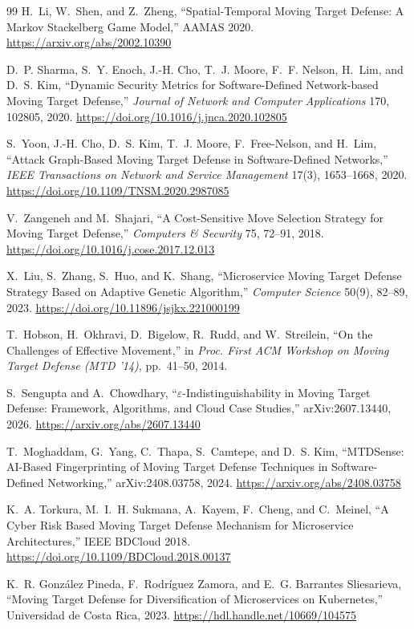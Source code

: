 \documentclass[11pt,letterpaper]{article}
\begin{document}
\begin{thebibliography}{99}
 H.~Li, W.~Shen, and Z.~Zheng, ``Spatial-Temporal Moving Target Defense: A Markov Stackelberg Game Model,'' AAMAS 2020. \url{https://arxiv.org/abs/2002.10390}

 D.~P. Sharma, S.~Y. Enoch, J.-H. Cho, T.~J. Moore, F.~F. Nelson, H.~Lim, and D.~S. Kim, ``Dynamic Security Metrics for Software-Defined Network-based Moving Target Defense,'' \emph{Journal of Network and Computer Applications} 170, 102805, 2020. \url{https://doi.org/10.1016/j.jnca.2020.102805}

 S.~Yoon, J.-H. Cho, D.~S. Kim, T.~J. Moore, F.~Free-Nelson, and H.~Lim, ``Attack Graph-Based Moving Target Defense in Software-Defined Networks,'' \emph{IEEE Transactions on Network and Service Management} 17(3), 1653--1668, 2020. \url{https://doi.org/10.1109/TNSM.2020.2987085}

 V.~Zangeneh and M.~Shajari, ``A Cost-Sensitive Move Selection Strategy for Moving Target Defense,'' \emph{Computers \& Security} 75, 72--91, 2018. \url{https://doi.org/10.1016/j.cose.2017.12.013}

 X.~Liu, S.~Zhang, S.~Huo, and K.~Shang, ``Microservice Moving Target Defense Strategy Based on Adaptive Genetic Algorithm,'' \emph{Computer Science} 50(9), 82--89, 2023. \url{https://doi.org/10.11896/jsjkx.221000199}

 T.~Hobson, H.~Okhravi, D.~Bigelow, R.~Rudd, and W.~Streilein, ``On the Challenges of Effective Movement,'' in \emph{Proc. First ACM Workshop on Moving Target Defense (MTD '14)}, pp.~41--50, 2014.

 S.~Sengupta and A.~Chowdhary, ``$\varepsilon$-Indistinguishability in Moving Target Defense: Framework, Algorithms, and Cloud Case Studies,'' arXiv:2607.13440, 2026. \url{https://arxiv.org/abs/2607.13440}

 T.~Moghaddam, G.~Yang, C.~Thapa, S.~Camtepe, and D.~S. Kim, ``MTDSense: AI-Based Fingerprinting of Moving Target Defense Techniques in Software-Defined Networking,'' arXiv:2408.03758, 2024. \url{https://arxiv.org/abs/2408.03758}

 K.~A. Torkura, M.~I.~H. Sukmana, A.~Kayem, F.~Cheng, and C.~Meinel, ``A Cyber Risk Based Moving Target Defense Mechanism for Microservice Architectures,'' IEEE BDCloud 2018. \url{https://doi.org/10.1109/BDCloud.2018.00137}

 K.~R. Gonz\'alez Pineda, F.~Rodr\'iguez Zamora, and E.~G. Barrantes Sliesarieva, ``Moving Target Defense for Diversification of Microservices on Kubernetes,'' Universidad de Costa Rica, 2023. \url{https://hdl.handle.net/10669/104575}


\end{thebibliography}
\end{document}
